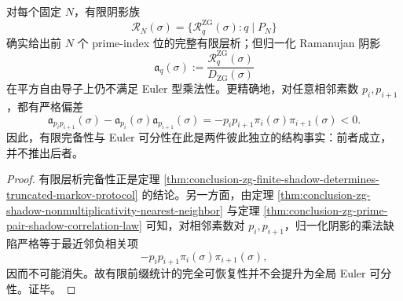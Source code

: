 \begin{corollary}\label{cor:conclusion-zg-finite-shadow-completeness-does-not-imply-euler-factorization}
对每个固定 \(N\)，有限阴影族
\[
\mathcal R_N(\sigma)=\{\mathcal R_q^{\mathrm{ZG}}(\sigma):q\mid P_N\}
\]
确实给出前 \(N\) 个 prime-index 位的完整有限层析；但归一化 Ramanujan 阴影
\[
\mathfrak a_q(\sigma):=\frac{\mathcal R_q^{\mathrm{ZG}}(\sigma)}{D_{\mathrm{ZG}}(\sigma)}
\]
在平方自由导子上仍不满足 Euler 型乘法性。更精确地，对任意相邻素数 \(p_i,p_{i+1}\)，都有严格偏差
\[
\mathfrak a_{p_ip_{i+1}}(\sigma)-\mathfrak a_{p_i}(\sigma)\mathfrak a_{p_{i+1}}(\sigma)
=
-p_ip_{i+1}\pi_i(\sigma)\pi_{i+1}(\sigma)<0.
\]
因此，有限完备性与 Euler 可分性在此是两件彼此独立的结构事实：前者成立，并不推出后者。
\end{corollary}
\begin{proof}
有限层析完备性正是定理
\ref{thm:conclusion-zg-finite-shadow-determines-truncated-markov-protocol}
的结论。另一方面，由定理
\ref{thm:conclusion-zg-shadow-nonmultiplicativity-nearest-neighbor}
与定理
\ref{thm:conclusion-zg-prime-pair-shadow-correlation-law}
可知，对相邻素数对 \(p_i,p_{i+1}\)，归一化阴影的乘法缺陷严格等于最近邻负相关项
\[
-p_ip_{i+1}\pi_i(\sigma)\pi_{i+1}(\sigma),
\]
因而不可能消失。故有限前缀统计的完全可恢复性并不会提升为全局 Euler 可分性。证毕。
\end{proof}

